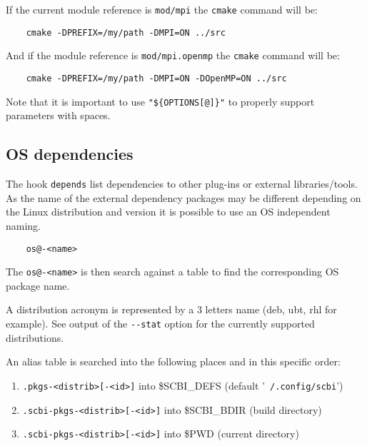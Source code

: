 \documentclass[a4paper,12pt,twoside]{article}
\newcommand{\code}[1]{\texttt{#1}}
\newcommand{\file}[1]{'{\texttt{#1}}'}
\newcommand{\ddash}{-{}-}
\begin{document}
If the current module reference is \code{mod/mpi} the \code{cmake} command will be:

\begin{lstlisting}
	cmake -DPREFIX=/my/path -DMPI=ON ../src
\end{lstlisting}

And if the module reference is \code{mod/mpi.openmp} the \code{cmake} command will be:

\begin{lstlisting}
	cmake -DPREFIX=/my/path -DMPI=ON -DOpenMP=ON ../src
\end{lstlisting}

Note that it is important to use \code{"\$\{OPTIONS[@]\}"} to properly support parameters with spaces.

\subsection{OS dependencies}
\label{OS dependencies}

The hook \code{depends} list dependencies to other plug-ins or external libraries/tools. As the name of the external dependency packages may be different depending on the Linux distribution and version it is possible to use an OS independent naming.

\begin{lstlisting}
	os@-<name>
\end{lstlisting}

The \code{os@-<name>} is then search against a table to find the corresponding OS package name.

A distribution acronym is represented by a 3 letters name (deb, ubt, rhl for example). See output of the \code{\ddash{}stat} option for the currently supported distributions.

An alias table is searched into the following places and in this specific order:

\begin{enumerate}
	\item \code{.pkgs-<distrib>[-<id>]} into \$SCBI\_DEFS (default \file{~/.config/scbi})
	\item \code{.scbi-pkgs-<distrib>[-<id>]} into \$SCBI\_BDIR (build directory)
	\item \code{.scbi-pkgs-<distrib>[-<id>]} into \$PWD (current directory)
\end{enumerate}
\end{document}

